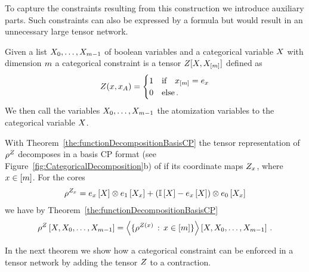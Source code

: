 To capture the constraints resulting from this construction we introduce auxiliary parts. %
Such constraints can also be expressed by a formula but would result in an unnecessary large tensor network.


\begin{definition}
	Given a list $X_{0},\ldots,X_{m-1}$ of boolean variables and a categorical variable $X$ with dimension $m$ a categorical constraint is a tensor $Z[X,X_{[m]}]$ defined as
	\begin{align*}
		 Z(x,x_{A}) 
		 = \begin{cases} 
		 	1 & \text{if} \quad x_{[m]} = e_{x} \\
			0 & \text{else} \, . 
		 \end{cases}
	\end{align*}
	We then call the variables  $X_{0},\ldots,X_{m-1}$ the atomization variables to the categorical variable $X$.
\end{definition}

With Theorem~\ref{the:functionDecompositionBasisCP} the tensor representation of $\rho^{Z}$ decomposes in a basis CP format (see Figure~\ref{fig:CategoricalDecomposition}b) of if its coordinate maps $Z_{x}$, where $x\in[m]$.
For the cores
\begin{align}
	\rho^{Z_{x}} = e_{x}\left[X\right] \otimes e_{1}\left[X_{x}\right] + (\mathbb{I}\left[X\right]- e_{x}\left[X\right] ) \otimes e_{0}\left[X_{x}\right] 
\end{align}	
we have by Theorem~\ref{the:functionDecompositionBasisCP}
\begin{align*}
	\rho^{Z}\left[X, X_{0}, \ldots, X_{m-1}\right] 
	= \left\langle \{\rho^{Z(x)} \, : \, x\in[m]\}\right\rangle \left[ X, X_{0}, \ldots, X_{m-1} \right] \, . 
\end{align*}


In the next theorem we show how a categorical constraint can be enforced in a tensor network by adding the tensor $Z$ to a contraction.

